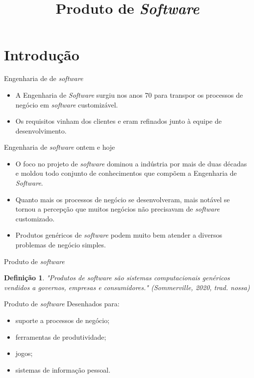 \documentclass[11pt]{beamer}
\title{Produto de \textit{Software}}
\author{}
\date{}
\newtheorem{mydef}{Definição}
\begin{document}
   \begin{frame}[plain]
        \titlepage
   \end{frame}

   \section{Introdução}

   \begin{frame}{Engenharia de de \textit{software}}
      \begin{itemize}
         \item A Engenharia de \textit{Software} surgiu nos anos 70 para transpor os processos de negócio em \textit{software} customizável.
         \item Os requisitos vinham dos clientes e eram refinados junto à equipe de desenvolvimento.
      \end{itemize}
   \end{frame}

   \begin{frame}{Engenharia de \textit{software} ontem e hoje}
      \begin{itemize}
         \item O foco no projeto de \textit{software} dominou a indústria por mais de duas décadas e moldou todo conjunto de conhecimentos que compõem a Engenharia de \textit{Software}.
         \item Quanto mais os processos de negócio se desenvolveram, mais notável se tornou a percepção que muitos negócios não precisavam de \textit{software} customizado.
         \item Produtos genéricos de \textit{software} podem muito bem atender a diversos problemas de negócio simples.
      \end{itemize}
   \end{frame}
   
   \begin{frame}{Produto de \textit{software}}
      \begin{mydef}
         "Produtos de \textit{software} são sistemas computacionais genéricos vendidos a governos, empresas e consumidores." (Sommerville, 2020, trad. nossa)
      \end{mydef}
   \end{frame}

   \begin{frame}{Produto de \textit{software}}
      Desenhados para:
      \begin{itemize}
         \item suporte a processos de negócio;
         \item ferramentas de produtividade;
         \item jogos;
         \item sistemas de informação pessoal.
      \end{itemize}
   \end{frame}
\end{document}
